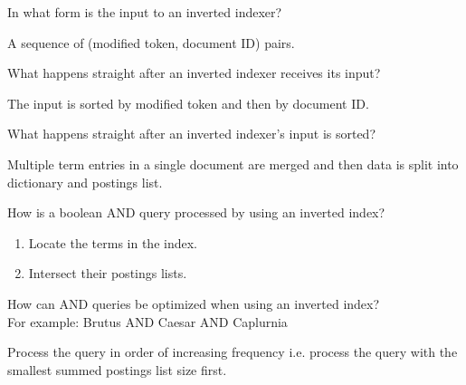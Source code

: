 \documentclass[2by4,grid]{flashcards}
\begin{document}
\begin{flashcard}{In what form is the input to an inverted indexer?}
	\begin{center}
        A sequence of (modified token, document ID) pairs.
	\end{center}
\end{flashcard}

\begin{flashcard}{What happens straight after an inverted indexer receives its input?}
	\begin{center}
        The input is sorted by modified token and then by document ID.
	\end{center}
\end{flashcard}

\begin{flashcard}{What happens straight after an inverted indexer's input is sorted?}
	\begin{center}
        Multiple term entries in a single document are merged and then data is split into dictionary and postings list.
	\end{center}
\end{flashcard}

\begin{flashcard}{How is a boolean AND query processed by using an inverted index?}
	\begin{center}
        \begin{enumerate}
            \item Locate the terms in the index.
            \item Intersect their postings lists.
        \end{enumerate}
	\end{center}
\end{flashcard}

\begin{flashcard}{How can AND queries be optimized when using an inverted index?\\ \vspace{.4cm} For example: Brutus AND Caesar AND Caplurnia}
	\begin{center}
        Process the query in order of increasing frequency i.e. process the query with the smallest summed postings list size first.
	\end{center}
\end{flashcard}
\end{document}
